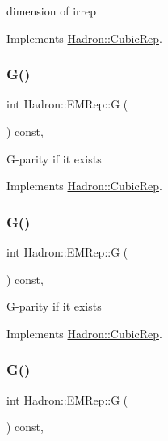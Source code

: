 dimension of irrep 

Implements \mbox{\hyperlink{structHadron_1_1CubicRep_ac178d14064f037a66af4b9fb4b312d51}{Hadron\+::\+Cubic\+Rep}}.

\mbox{\label{structHadron_1_1EMRep_a7db588926f9f4b10f810a5d0d1980bdf}} 
\subsubsection{\texorpdfstring{G()}{G()}\hspace{0.1cm}{\footnotesize\ttfamily [1/3]}}
{\footnotesize\ttfamily int Hadron\+::\+E\+M\+Rep\+::G (\begin{DoxyParamCaption}{ }\end{DoxyParamCaption}) const\hspace{0.3cm}{\ttfamily [inline]}, {\ttfamily [virtual]}}

G-\/parity if it exists 

Implements \mbox{\hyperlink{structHadron_1_1CubicRep_a52104e43266d1614c00bbd1c3b395458}{Hadron\+::\+Cubic\+Rep}}.

\mbox{\label{structHadron_1_1EMRep_a7db588926f9f4b10f810a5d0d1980bdf}} 
\subsubsection{\texorpdfstring{G()}{G()}\hspace{0.1cm}{\footnotesize\ttfamily [2/3]}}
{\footnotesize\ttfamily int Hadron\+::\+E\+M\+Rep\+::G (\begin{DoxyParamCaption}{ }\end{DoxyParamCaption}) const\hspace{0.3cm}{\ttfamily [inline]}, {\ttfamily [virtual]}}

G-\/parity if it exists 

Implements \mbox{\hyperlink{structHadron_1_1CubicRep_a52104e43266d1614c00bbd1c3b395458}{Hadron\+::\+Cubic\+Rep}}.

\mbox{\label{structHadron_1_1EMRep_a7db588926f9f4b10f810a5d0d1980bdf}} 
\subsubsection{\texorpdfstring{G()}{G()}\hspace{0.1cm}{\footnotesize\ttfamily [3/3]}}
{\footnotesize\ttfamily int Hadron\+::\+E\+M\+Rep\+::G (\begin{DoxyParamCaption}{ }\end{DoxyParamCaption}) const\hspace{0.3cm}{\ttfamily [inline]}, {\ttfamily [virtual]}}

